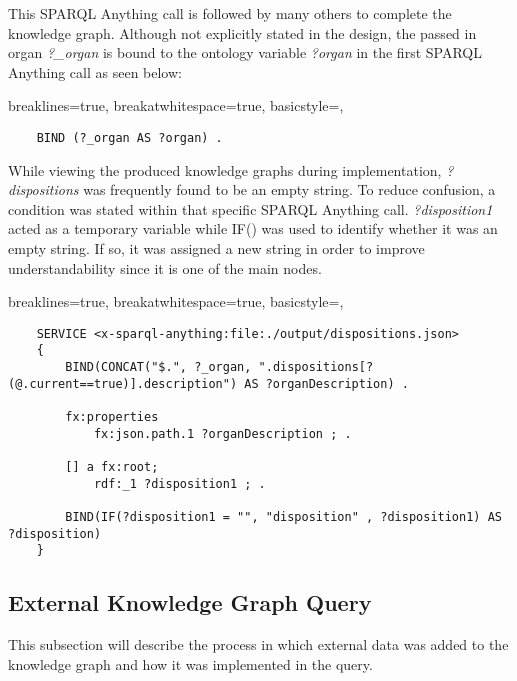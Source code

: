 This SPARQL Anything call is followed by many others to complete the knowledge graph. Although not explicitly stated in the design, the passed in organ \textit{?\_organ} is bound to the ontology variable \textit{?organ} in the first SPARQL Anything call as seen below:

\lstset
{
    breaklines=true,
    breakatwhitespace=true,
    basicstyle=\linespread{1.5}\ttfamily,
}
\begin{lstlisting}
    BIND (?_organ AS ?organ) .
\end{lstlisting}

While viewing the produced knowledge graphs during implementation, \textit{?dispositions} was frequently found to be an empty string. To reduce confusion, a condition was stated within that specific SPARQL Anything call. \textit{?disposition1} acted as a temporary variable while IF() was used to identify whether it was an empty string. If so, it was assigned a new string in order to improve understandability since it is one of the main nodes. 

\lstset
{
    breaklines=true,
    breakatwhitespace=true,
    basicstyle=\linespread{1.5}\ttfamily,
}
\begin{lstlisting}
    SERVICE <x-sparql-anything:file:./output/dispositions.json>
    {
        BIND(CONCAT("$.", ?_organ, ".dispositions[?(@.current==true)].description") AS ?organDescription) .
    
        fx:properties
            fx:json.path.1 ?organDescription ; .
    
        [] a fx:root; 
            rdf:_1 ?disposition1 ; .
    
        BIND(IF(?disposition1 = "", "disposition" , ?disposition1) AS ?disposition)
    } 
\end{lstlisting}

\subsection{External Knowledge Graph Query}
\hspace*{0.5cm} This subsection will describe the process in which external data was added to the knowledge graph and how it was implemented in the query. 


